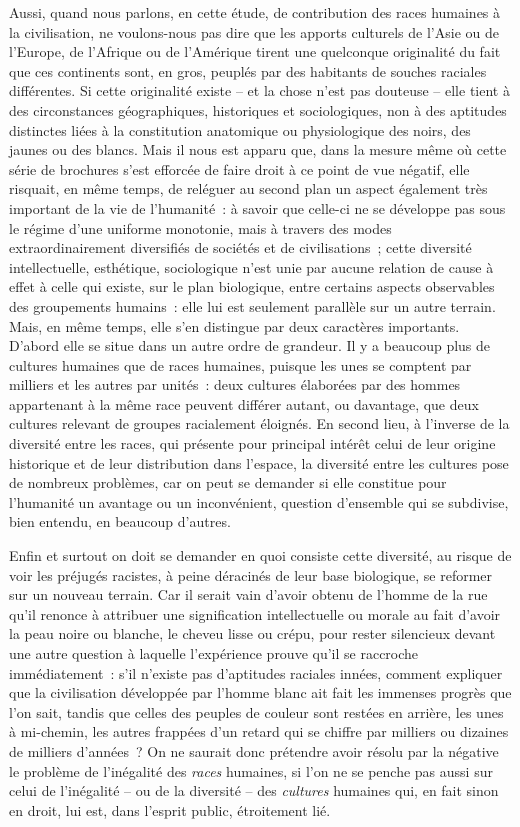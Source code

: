 \documentclass[french,twoside]{book} %
\begin{document}
Aussi, quand nous parlons, en cette étude, de contribution des races humaines à la civilisation, ne voulons-nous pas dire que les apports culturels de l’Asie ou de l’Europe, de l’Afrique ou de l’Amérique tirent une quelconque originalité du fait que ces continents sont, en gros, peuplés par des habitants de souches raciales différentes. Si cette originalité existe – et la chose n’est pas douteuse – elle tient à des circonstances géographiques, historiques et sociologiques, non à des aptitudes distinctes liées à la constitution anatomique ou physiologique des noirs, des jaunes ou des blancs. Mais il nous est apparu que, dans la mesure même où cette série de brochures s’est efforcée de faire droit à ce point de vue négatif, elle risquait, en même temps, de reléguer au second plan un aspect également très important de la vie de l’humanité : à savoir que celle-ci ne se développe pas sous le régime d’une uniforme monotonie, mais à travers des modes extraordinairement diversifiés de sociétés et de civilisations ; cette diversité intellectuelle, esthétique, sociologique n’est unie par aucune relation de cause à effet à celle qui existe, sur le plan biologique, entre certains aspects observables des groupements humains : elle lui est seulement parallèle sur un autre terrain. Mais, en même temps, elle s’en distingue par deux caractères importants. D’abord elle se situe dans un autre ordre de grandeur. Il y a beaucoup plus de cultures humaines que de races humaines, puisque les unes se comptent par milliers et les autres par unités : deux cultures élaborées par des hommes appartenant à la même race peuvent différer autant, ou davantage, que deux cultures relevant de groupes racialement éloignés. En second lieu, à l’inverse de la diversité entre les races, qui présente pour principal intérêt celui de leur origine historique et de leur distribution dans l’espace, la diversité entre les cultures pose de nombreux problèmes, car on peut se demander si elle constitue pour l’humanité un avantage ou un inconvénient, question d’ensemble qui se subdivise, bien entendu, en beaucoup d’autres.\par
Enfin et surtout on doit se demander en quoi consiste cette diversité, au risque de voir les préjugés racistes, à peine déracinés de leur base biologique, se reformer sur un nouveau terrain. Car il serait vain d’avoir obtenu de l’homme de la rue qu’il renonce à attribuer une signification intellectuelle ou morale au fait d’avoir la peau noire ou blanche, le cheveu lisse ou crépu, pour rester silencieux devant une autre question à laquelle l’expérience prouve qu’il se raccroche immédiatement : s’il n’existe pas d’aptitudes raciales innées, comment expliquer que la civilisation développée par l’homme blanc ait fait les immenses progrès que l’on sait, tandis que celles des peuples de couleur sont restées en arrière, les unes à mi-chemin, les autres frappées d’un retard qui se chiffre par milliers ou dizaines de milliers d’années ? On ne saurait donc prétendre avoir résolu par la négative le problème de l’inégalité des \emph{races} humaines, si l’on ne se penche pas aussi sur celui de l’inégalité – ou de la diversité – des \emph{cultures} humaines qui, en fait sinon en droit, lui est, dans l’esprit public, étroitement lié.
\end{document}
